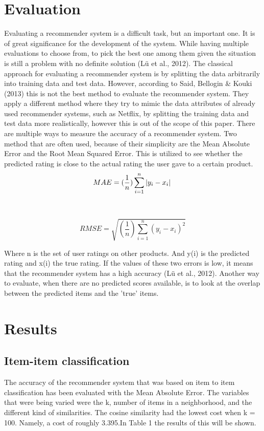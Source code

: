 \documentclass[11pt]{article}
\begin{document}
	\section{Evaluation}
	Evaluating a recommender system is a difficult task, but an important one. It is of great significance for the development of the system. While having multiple evaluations to choose from, to pick the best one among them given the situation is still a problem with no definite solution (Lü et al., 2012).  The classical approach for evaluating a recommender system is by splitting the data arbitrarily into training data and test data. However, according to Said, Bellogin & Kouki (2013) this is not the best method to evaluate the recommender system. They apply a different method where they try to mimic the data attributes of already used recommender systems, such as Netflix, by splitting the training data and test data more realistically, however this is out of the scope of this paper. There are multiple ways to measure the accuracy of a recommender system. Two method that are often used, because of their simplicity are the Mean Absolute Error and the Root Mean Squared Error. This is utilized to see whether the predicted rating is close to the actual rating the user gave to a certain product. \\
	\m
	$$MAE =  (\frac{1}{n})\sum_{i=1}^{n}\left | y_{i} - x_{i} \right |\\ $$\\
	\\$$RMSE=\sqrt{(\frac{1}{n})\sum_{i=1}^{n}(y_{i} - x_{i})^{2}} $$
	
	Where n is the set of user ratings on other products. And y(i) is the predicted rating and x(i)  the true rating. 
	If the values of these two errors is low, it means that the recommender system has a high accuracy (Lü et al., 2012). Another way to evaluate, when there are no predicted scores available, is to look at the overlap between the predicted items and the 'true' items.
	
	
	\section{Results}
	\subsection{Item-item classification}
	The accuracy of the recommender system that was based on item to item classification has been evaluated with the Mean Absolute Error. The variables that were being varied were the k, number of items in a neighborhood, and the different kind of similarities. The cosine similarity had the lowest cost when k = 100. Namely, a cost of roughly 3.395.In Table 1 the results of this will be shown.\\ 
	
\end{document}
